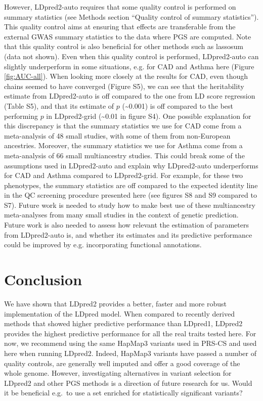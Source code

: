 \documentclass{bioinfo}
\begin{document}
However, LDpred2-auto requires that some quality control is performed on summary statistics (see Methods section ``Quality control of summary statistics'').
This quality control aims at ensuring that effects are transferable from the external GWAS summary statistics to the data where PGS are computed.
Note that this quality control is also beneficial for other methods such as lassosum (data not shown).
Even when this quality control is performed, LDpred2-auto can slightly underperform in some situations, e.g. for CAD and Asthma here (Figure \ref{fig:AUC-all}).
When looking more closely at the results for CAD, even though chains seemed to have converged (Figure S5), we can see that the heritability estimate from LDpred2-auto is off compared to the one from LD score regression (Table S5), and that its estimate of $p$ (\textasciitilde0.001) is off compared to the best performing $p$ in LDpred2-grid (\textasciitilde0.01 in figure S4).
One possible explanation for this discrepancy is that the summary statistics we use for CAD come from a meta-analysis of 48 small studies, with some of them from non-European ancestries.
Moreover, the summary statistics we use for Asthma come from a meta-analysis of 66 small multiancestry studies.
This could break some of the assumptions used in LDpred2-auto and explain why LDpred2-auto underperforms for CAD and Asthma compared to LDpred2-grid. 
For example, for these two phenotypes, the summary statistics are off compared to the expected identity line in the QC screening procedure presented here (see figures S8 and S9 compared to S7).
Future work is needed to study how to make best use of these multiancestry meta-analyses from many small studies in the context of genetic prediction.
Future work is also needed to assess how relevant the estimation of parameters from LDpred2-auto is, and whether its estimates and its predictive performance could be improved by e.g. incorporating functional annotations.


\section{Conclusion}

We have shown that LDpred2 provides a better, faster and more robust implementation of the LDpred model.
When compared to recently derived methods that showed higher predictive performance than LDpred1, LDpred2 provides the highest predictive performance for all the real traits tested here.
For now, we recommend using the same HapMap3 variants used in PRS-CS and used here when running LDpred2. 
Indeed, HapMap3 variants have passed a number of quality controls, are generally well imputed and offer a good coverage of the whole genome.
However, investigating alternatives in variant selection for LDpred2 and other PGS methods is a direction of future research for us.
Would it be beneficial e.g.\ to use a set enriched for statistically significant variants? 
\end{document}
